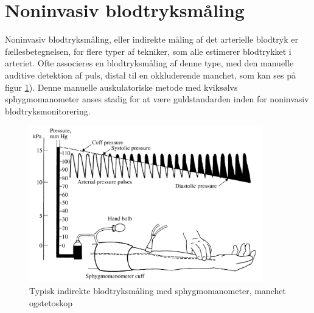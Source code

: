 \section{Noninvasiv blodtryksmåling}\label{noninvasivBloodpressureMeasurement}
Noninvasiv blodtryksmåling, eller indirekte måling af det arterielle blodtryk er fællesbetegnelsen, for flere typer af tekniker, som alle estimerer blodtrykket i arteriet. Ofte associeres en blodtryksmåling af denne type, med den manuelle auditive detektion af puls, distal til en okkluderende manchet, som kan ses på figur \ref{fig:audiotoryBloodpressureMeasurement}). Denne manuelle auskulatoriske metode med kviksølvs sphygmomanometer anses stadig for at være guldstandarden inden for noninvasiv blodtryksmonitorering.

\begin{figure}[H]
	\includegraphics[width=0.9\textwidth]{billeder/TypicalIndirectBlood-pressureMeasurement.png}
	\caption{Typisk indirekte blodtryksmåling med sphygmomanometer, manchet ogstetoskop}\label{fig:audiotoryBloodpressureMeasurement}
\end{figure}

